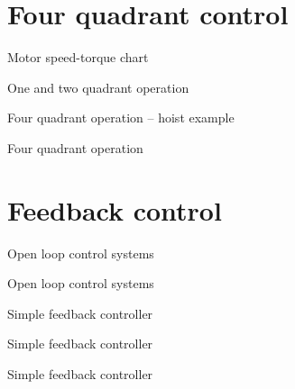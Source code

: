 \documentclass[compress]{beamer}
\begin{document}
\section{Four quadrant control}

{
    \begin{frame}{Motor speed-torque chart}
    \end{frame}
}

{
    \begin{frame}{One and two quadrant operation}
    \end{frame}
}

{
    \begin{frame}{Four quadrant operation -- hoist example}
    \end{frame}
}

{
    \begin{frame}{Four quadrant operation}
    \end{frame}
}

\section{Feedback control}

{
    \begin{frame}{Open loop control systems}
    \end{frame}
}

{
    \begin{frame}{Open loop control systems}
    \end{frame}
}

{
    \begin{frame}{Simple feedback controller}
    \end{frame}
}

{
    \begin{frame}{Simple feedback controller}
    \end{frame}
}

{
    \begin{frame}{Simple feedback controller}
    \end{frame}
}
\end{document}
